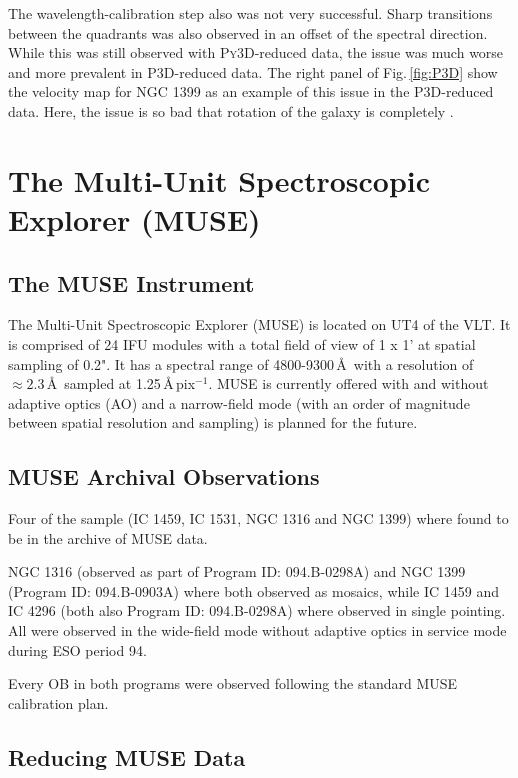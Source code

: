 		The wavelength-calibration step also was not very successful. Sharp transitions between the quadrants was also observed in an offset of the spectral direction. While this was still observed with \textsc{Py3D}-reduced data, the issue was much worse and more prevalent in \textsc{P3D}-reduced data. The right panel of Fig.\,\ref{fig:P3D} show the velocity map for NGC 1399 as an example of this issue in the \textsc{P3D}-reduced data. Here, the issue is so bad that rotation of the galaxy is completely .

		






\section{The Multi-Unit Spectroscopic Explorer (MUSE)}
	\label{sec:MUSE}

	\subsection{The MUSE Instrument}
		The Multi-Unit Spectroscopic Explorer (MUSE) is located on UT4 of the VLT. It is comprised of 24 IFU modules with a total field of view of 1 x 1' at spatial sampling of 0.2". It has a spectral range of 4800-9300\,\AA\ with a resolution of $\approx 2.3$\,\AA\ sampled at 1.25\,\AA\,pix$^{-1}$. MUSE is currently offered with and without adaptive optics (AO) and a narrow-field mode (with an order of magnitude between spatial resolution and sampling) is planned for the future. 
		
	\subsection{MUSE Archival Observations}
		Four of the sample (IC 1459, IC 1531, NGC 1316 and NGC 1399) where found to be in the archive of MUSE data.

		NGC 1316 (observed as part of Program ID: 094.B-0298A) and NGC 1399 (Program ID: 094.B-0903A) where both observed as mosaics, while IC 1459 and IC 4296 (both also Program ID: 094.B-0298A) where observed in single pointing. All were observed in the wide-field mode without adaptive optics in service mode during ESO period 94. 

		Every OB in both programs were observed following the standard MUSE calibration plan.

	\subsection{Reducing MUSE Data}
		\label{subsec:MUSEreduction}
		
